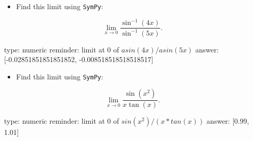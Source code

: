 \documentclass[12pt]{article}
\begin{document}
\begin{itemize}
\itemsep1pt\parskip0pt
\item
  Find this limit using \texttt{SymPy}:
\end{itemize}

\[
\lim_{x \rightarrow 0} \frac{\sin^{-1}(4x)}{\sin^{-1}(5x)}.
\]

\begin{answer}
    type: numeric
    reminder: limit at 0 of \( asin(4x)/asin(5x) \)
    answer: [-0.02851851851851852, -0.008518518518518517]

\end{answer}

\begin{itemize}
\itemsep1pt\parskip0pt
\item
  Find this limit using \texttt{SymPy}:
\end{itemize}

\[
\lim_{x \rightarrow 0} \frac{\sin(x^2)}{x\tan(x)}.
\]

\begin{answer}
    type: numeric
    reminder: limit at 0 of \( sin(x^2)/(x*tan(x)) \)
    answer: [0.99, 1.01]

\end{answer}
\end{document}

